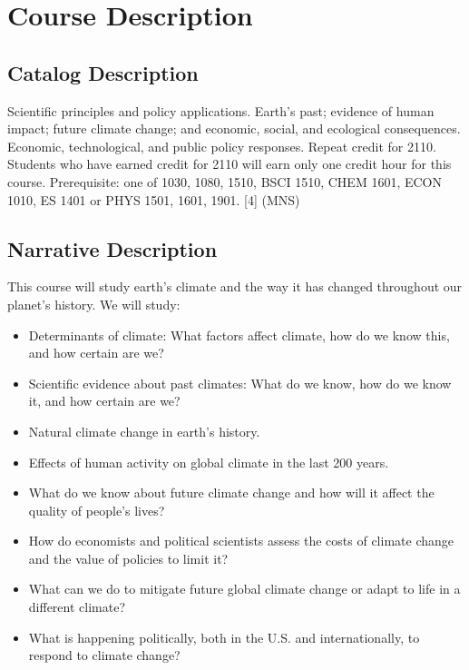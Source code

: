 \documentclass[11pt,twoside]{jgsyllabus}\usepackage[]{graphicx}\usepackage[]{color}
\begin{document}
\medskip
\clearpage
\section[Description]{Course Description}
\subsection{Catalog Description}
Scientific principles and policy applications. Earth's past; evidence of human
impact; future climate change; and economic, social, and ecological consequences.
Economic, technological, and public policy responses. Repeat credit for 2110.
Students who have earned credit for 2110 will earn only one credit hour for
this course. Prerequisite: one of 1030, 1080, 1510, BSCI 1510, CHEM 1601,
ECON 1010, ES 1401 or PHYS 1501, 1601, 1901. [4] (MNS)
\subsection{Narrative Description}
This course will study earth's climate and the way it has changed throughout
our planet's history. We will study:
\begin{itemize}
	\item Determinants of climate: What factors affect climate, how do we know
	  this, and how certain are we?
    \item Scientific evidence about past climates: What do we know, how do we
    know it, and how certain are we?
	\item Natural climate change in earth's history.
	\item Effects of human activity on global climate in the last 200 years.
	\item What do we know about future climate change and how will it affect the
	quality of people's lives?
	\item How do economists and political scientists assess the costs of climate
	change and the value of policies to limit it?
	\item What can we do to mitigate future global climate change or adapt to life
	in a different climate?
	\item What is happening politically, both in the U.S. and internationally, to
	respond to climate change?
\end{itemize}
\end{document}
